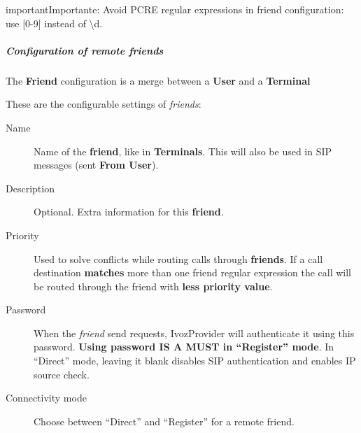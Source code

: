 \documentclass[letterpaper,10pt,spanish]{sphinxmanual}
\begin{document}
\begin{notice}{important}{Importante:}
Avoid PCRE regular expressions in friend configuration: use {[}0-9{]} instead of \textbackslash{}d.
\end{notice}


\subparagraph{Configuration of remote friends}
\label{administration_portal/client/vpbx/routing_endpoints/friends/remote_friends:configuration-of-remote-friends}
The \textbf{Friend} configuration is a merge between a \textbf{User} and a \textbf{Terminal}

These are the configurable settings of \emph{friends}:
\begin{description}
\item[{Name}] \leavevmode{}\label{administration_portal/client/vpbx/routing_endpoints/friends/remote_friends:term-name}
Name of the \textbf{friend}, like in \textbf{Terminals}. This will also be used
in SIP messages (sent \textbf{From User}).

\item[{Description}] \leavevmode{}\label{administration_portal/client/vpbx/routing_endpoints/friends/remote_friends:term-description}
Optional. Extra information for this \textbf{friend}.

\item[{Priority}] \leavevmode{}\label{administration_portal/client/vpbx/routing_endpoints/friends/remote_friends:term-priority}
Used to solve conflicts while routing calls through \textbf{friends}.
If a call destination \textbf{matches} more than one friend regular expression
the call will be routed through the friend with \textbf{less priority value}.

\item[{Password}] \leavevmode{}\label{administration_portal/client/vpbx/routing_endpoints/friends/remote_friends:term-password}
When the \emph{friend} send requests, IvozProvider will authenticate it using
this password. \textbf{Using password IS A MUST in ``Register'' mode}. In ``Direct'' mode,
leaving it blank disables SIP authentication and enables IP source check.

\item[{Connectivity mode}] \leavevmode{}\label{administration_portal/client/vpbx/routing_endpoints/friends/remote_friends:term-connectivity-mode}
Choose between ``Direct'' and ``Register'' for a remote friend.


\end{description}
\end{document}

